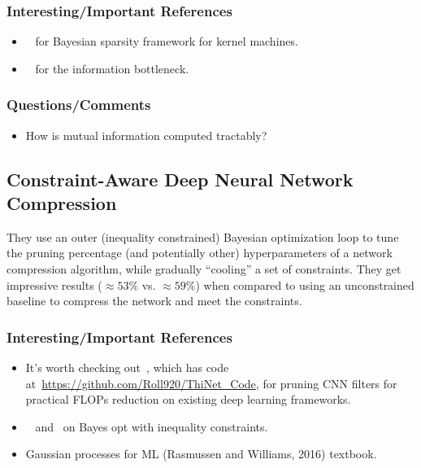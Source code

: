 \documentclass[a4paper, 12pt]{article}
\begin{document}
\subsubsection{Interesting/Important References}

\begin{itemize}
        \item~\cite{tipping2001sparse} for Bayesian sparsity framework for
                kernel machines.

        \item~\cite{tishby1999theinformation} for the information bottleneck.
\end{itemize}


\subsubsection{Questions/Comments}

\begin{itemize}
        \item How is mutual information computed tractably?
\end{itemize}


\subsection{Constraint-Aware Deep Neural Network
            Compression~\cite{chen2018constraint}}

They use an outer (inequality constrained) Bayesian optimization loop to tune
the pruning percentage (and potentially other) hyperparameters of a network
compression algorithm, while gradually ``cooling'' a set of constraints. They
get impressive results ($\approx 53\%$ vs. $\approx 59\%$) when compared to
using an unconstrained baseline to compress the network and meet the
constraints.


\subsubsection{Interesting/Important References}

\begin{itemize}
        \item It's worth checking out~\cite{luo2018thinet}, which has code
                at~\url{https://github.com/Roll920/ThiNet_Code}, for pruning
                CNN filters for practical FLOPs reduction on existing deep
                learning frameworks.

        \item~\cite{gelbart2014bayesian} and~\cite{gardner2014bayesian} on
                Bayes opt with inequality constraints.

        \item Gaussian processes for ML (Rasmussen and Williams, 2016)
                textbook.
\end{itemize}
\end{document}

